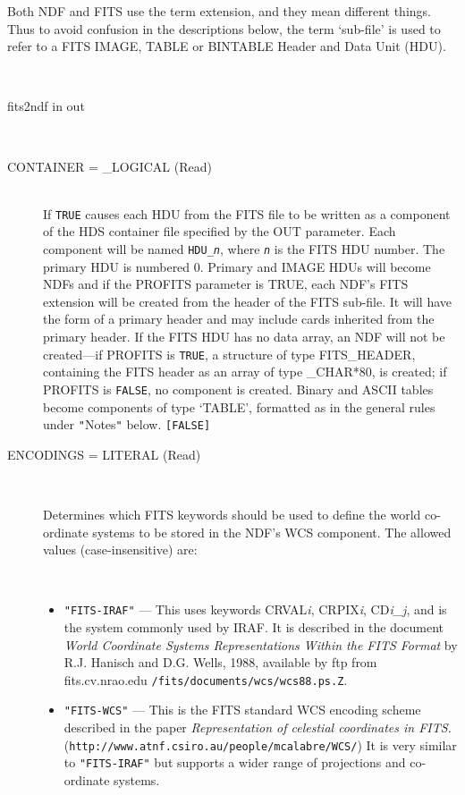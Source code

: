 \documentclass[twoside,11pt]{article}
\newcommand{\htmladdnormallink}[2]{#1}
\newcommand{\htmlref}[2]{#1}
\newcommand{\latex}[1]{#1}
\newcommand{\xref}[3]{#1}
\newcommand{\sstusage}[1]{\item[Usage:] \mbox{}
\\[1.3ex]{\raggedright \ssttt #1}}
\newcommand{\sstparameters}[1]{
   \goodbreak 
   \item[Parameters:] \mbox{} \\
   \vspace{-3.5ex}
   \begin{description}
      #1
   \end{description}
}
\newcommand{\sstsubsection}[1]{ \item[{#1}] \mbox{} \\}
\newcommand{\ssthitemlist}[1]{
  \latex{
  \mbox{} \\
  \vspace{-3.5ex}
  }
  \begin{itemize}
     #1
  \end{itemize}
}
\newcommand{\sstitem}{\item}
\newcommand{\sstusage}[1]{\item[\htmlref{Usage:}{app_usage}]
      \begin{description}
         {\ssttt #1}
      \end{description}
      \\
   }
\newcommand{\sstparameters}[1]{
      \item[\xref{Parameters:}{sun95}{se_param}] \\
      \begin{description}
         #1
      \end{description}
   }
\newcommand{\sstsubsection}[1]{\item[{#1}]}
\newcommand{\sstitem}{\item}
\begin{document}
{{      Both NDF and FITS use the term extension, and they mean different
      things.  Thus to avoid confusion in the descriptions below, the term
      `sub-file' is used to refer to a FITS IMAGE, TABLE or BINTABLE Header
      and Data Unit (HDU).
   }
   \sstusage{
      fits2ndf in out
   }
   \sstparameters{
      \sstsubsection{
         CONTAINER = \_LOGICAL (Read)
      }{
         If \texttt{TRUE} causes each HDU from the FITS file to be written as
         a component of the HDS container file specified by the OUT
         parameter.  Each component will be named \texttt{HDU\_\textit{n}},
         where \texttt{\textit{n}} is the FITS HDU number. The primary HDU
         is numbered 0.  Primary and IMAGE HDUs will become NDFs and if the
         PROFITS parameter is TRUE, each NDF's FITS extension will be
         created from the header of the FITS sub-file.  It will have the form
         of a primary header and may include cards inherited from the primary
         header.  If the FITS HDU has no data array, an NDF will not be
         created---if PROFITS is \texttt{TRUE}, a structure of type FITS\_HEADER,
         containing the FITS header as an array of type \_CHAR*80, is created;
         if PROFITS is \texttt{FALSE}, no component is created.
         Binary and ASCII tables become components of type `TABLE',
         formatted as in the general rules under \texttt{"}Notes\texttt{"} below.
         \texttt{[FALSE]}
      }
      \sstsubsection{
         ENCODINGS = \xref{LITERAL}{sun95}{se_parmenu} (Read)
      }{
         Determines which FITS keywords should be used to define the
         world co-ordinate systems to be stored in the NDF's WCS
         component. The allowed values (case-insensitive) are:
         \ssthitemlist{

         \sstitem 
            \texttt{"FITS-IRAF"} --- This uses keywords CRVAL\textit{i},
            CRPIX\textit{i}, CD\textit{i\_j}, and is the
            system commonly used by IRAF. It is described in the document
            \textit{World Coordinate Systems Representations Within the FITS 
            Format} by R.J. Hanisch and D.G. Wells, 1988, available by ftp 
            from fits.cv.nrao.edu \texttt{/fits/documents/wcs/wcs88.ps.Z}.

         \sstitem
            \texttt{"FITS-WCS"} --- This is the FITS standard WCS encoding 
            scheme described in the paper 
            \htmladdnormallink{\textit{Representation of celestial coordinates in FITS.}}
            {http://www.atnf.csiro.au/people/mcalabre/WCS/}\\ \latex{
            (\texttt{http://www.atnf.csiro.au/people/mcalabre/WCS/})}  It is
            very similar to \texttt{"FITS-IRAF"} but supports a wider range of
            projections and co-ordinate systems.

}}}}
\end{document}
